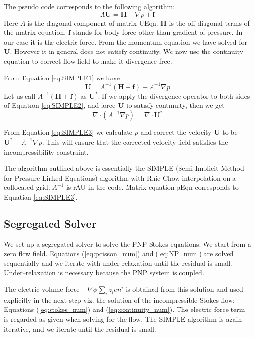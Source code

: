 The pseudo code corresponds to the following algorithm:
\begin{equation}
A \mathbf{U} = \mathbf{H} - \nabla p + \mathbf{f}
\label{eq:SIMPLE1}
\end{equation}
Here $A$ is the diagonal component of matrix \textsf{UEqn}. $\mathbf{H}$ is the off-diagonal terms of the matrix equation. $\mathbf{f}$ stands for body force other than gradient of pressure. In our case it is the electric force. From the momentum equation we have solved for $\mathbf{U}$. However it in general does not satisfy continuity. We now use the continuity equation to correct flow field to make it divergence free.

From Equation \ref{eq:SIMPLE1} we have 
\begin{equation}
\mathbf{U} = A^{-1}(\mathbf{H}+\mathbf{f}) - A^{-1}\nabla p
\label{eq:SIMPLE2}
\end{equation}
Let us call $A^{-1}(\mathbf{H}+\mathbf{f})$ as $\mathbf{U}^*$. If we apply the divergence operator to both sides of Equation \ref{eq:SIMPLE2}, and force $\mathbf{U}$ to satisfy continuity, then we get
\begin{equation}
\nabla \cdot \left(A^{-1}\nabla p\right) = \nabla \cdot \mathbf{U}^*
\label{eq:SIMPLE3}
\end{equation}

From Equation \ref{eq:SIMPLE3} we calculate $p$ and correct the velocity $\mathbf{U}$ to be $\mathbf{U}^* - A^{-1}\nabla p$. This will ensure that the corrected velocity field satisfies the incompressibility constraint.

The algorithm outlined above is essentially the SIMPLE (Semi-Implicit Method for Pressure Linked Equations) algorithm with Rhie-Chow interpolation on a collocated grid. $A^{-1}$ is \textsf{rAU} in the code. Matrix equation \textsf{pEqn} corresponds to Equation \ref{eq:SIMPLE3}.

\subsection{Segregated Solver}
We set up a segregated solver to solve the PNP-Stokes equations. We start from a zero flow field. Equations  (\ref{eq:poisson_num}) and (\ref{eq:NP_num}) are solved sequentially and we iterate with under-relaxation until the residual is small. Under--relaxation is necessary because the PNP system is coupled. 

The electric volume force $- \nabla \phi\sum_i z_ien^i $ is obtained from this solution and used explicitly in the next step viz. the solution of the incompressible Stokes flow: Equations (\ref{eq:stokes_num}) and (\ref{eq:continuity_num}). The electric force term is regarded as given when solving for the flow. The SIMPLE algorithm is again iterative, and we iterate until the residual is small.

